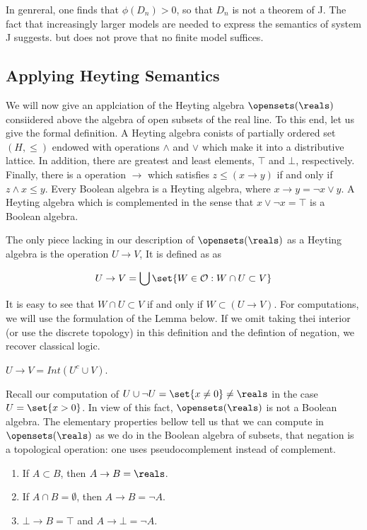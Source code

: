 In genreral, one finds that $\phi(D_n) > 0$, so that  $D_n$ is not a theorem of J.
The fact that increasingly larger models are needed to express the semantics of system J suggests. but does not prove that no finite model suffices.

\subsection{Applying Heyting Semantics}

We will now give an applciation of the Heyting algebra $\opensets(\reals)$ consiidered above \mdash the algebra of open subsets of the real line.  To this end, let us give the formal definition. A Heyting algebra conists of partially ordered set $(H, \le)$ endowed with operations $\land$ and $\lor$ which make it into a distributive lattice.  In addition, there are greatest and least elements, $\top$ and $\bot$, respectively.  Finally, there is a operation $\to$ which satisfies $z \le (x \to y)$ if and only if $z \land x \le y$.  Every Boolean algebra is a Heyting algebra, where $x \to y = \neg x \lor y$.  A Heyting algebra which is complemented in the sense that $x \lor \neg x = \top$ is a Boolean algebra. 

The only piece lacking in our description of  $\opensets(\reals)$ as a Heyting algebra
is the operation $U \to V$,  It is defined as as 

$$
U \to V = \bigcup \set{W\in \mathcal{O} : W \cap U \subset V }
$$

It is easy to see that $W \cap U \subset V$ if and only if $W \subset (U \to V)$.  For computations, we will use the formulation of the Lemma below.  If we omit taking thei interior  (or use the discrete topology) in this definition and the defintion of negation, we recover classical logic.

\begin{lemma} 
$U \to V = Int(U^c \cup V)$.
\end{lemma}

Recall our computation of $U \cup \neg U = \set{ x \ne 0 } \ne \reals$ in the case $U = \set{ x > 0}$.  In view of this fact, $\opensets(\reals)$ is not a Boolean algebra.
The elementary properties bellow tell us that we can compute in $\opensets(\reals)$ as we do in the Boolean algebra of subsets,  that negation is a topological operation: one uses pseudocomplement instead of complement.



\begin{enumerate}

\item  If $A \subset B$, then $A \to B = \reals$.

\item If $A \cap B = \emptyset$, then $A \to B = \neg A$.

\item $\bot \to B = \top$ and $A \to \bot = \neg A$.

\end{enumerate}

